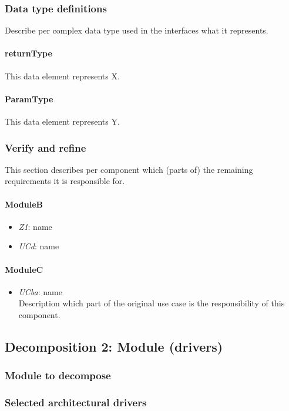 \documentclass[a4paper,10pt]{article}
\begin{document}
\subsubsection{Data type definitions}
Describe per complex data type used in the interfaces what it represents.

\paragraph{returnType} This data element represents X.

\paragraph{ParamType} This data element represents Y.

\subsubsection{Verify and refine}
This section describes per component which (parts of) the remaining
requirements it is responsible for.

\paragraph{ModuleB}
\begin{itemize}
    \item \emph{Z1}: name
    \item \emph{UCd}: name
\end{itemize}

\paragraph{ModuleC}
\begin{itemize}
    \item \emph{UCba}: name\\Description which part of the original use case is
        the responsibility of this component.
\end{itemize}

\subsection{Decomposition 2: Module (drivers)}
\subsubsection{Module to decompose}
\subsubsection{Selected architectural drivers}
\end{document}
